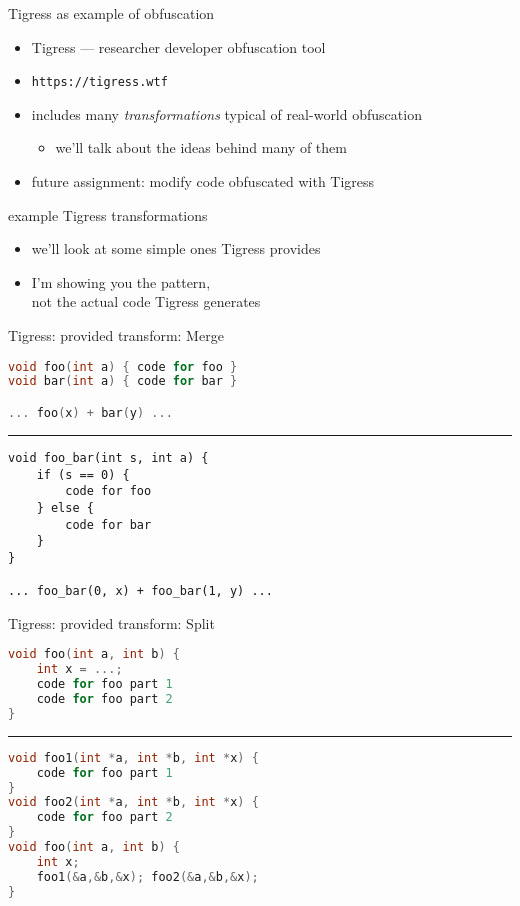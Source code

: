 \begin{frame}{Tigress as example of obfuscation}
    \begin{itemize}
    \item Tigress --- researcher developer obfuscation tool
    \item \texttt{https://tigress.wtf}
    \item includes many \textit{transformations} typical of real-world obfuscation
        \begin{itemize}
        \item we'll talk about the ideas behind many of them
        \end{itemize}
    \vspace{.5cm}
    \item future assignment: modify code obfuscated with Tigress
    \end{itemize}
\end{frame}
\begin{frame}{example Tigress transformations}
    \begin{itemize}
    \item we'll look at some simple ones Tigress provides
    \item I'm showing you the pattern, \\ not the actual code Tigress generates
    \end{itemize}
\end{frame}

\begin{frame}[fragile,label=TigressMerge]{Tigress: provided transform: Merge}
\begin{lstlisting}[language=C++,style=smaller]
void foo(int a) { code for foo }
void bar(int a) { code for bar }

... foo(x) + bar(y) ...
\end{lstlisting}
\hrule
\begin{lstlisting}
void foo_bar(int s, int a) {
    if (s == 0) {
        code for foo
    } else {
        code for bar
    }
}

... foo_bar(0, x) + foo_bar(1, y) ...
\end{lstlisting}
\end{frame}

\begin{frame}[fragile,label=TigressSplit]{Tigress: provided transform: Split}
\begin{lstlisting}[language=C++,style=smaller]
void foo(int a, int b) {
    int x = ...;
    code for foo part 1
    code for foo part 2
}
\end{lstlisting}
\hrule
\begin{lstlisting}[language=C++,style=smaller]
void foo1(int *a, int *b, int *x) {
    code for foo part 1
}
void foo2(int *a, int *b, int *x) {
    code for foo part 2
}
void foo(int a, int b) {
    int x;
    foo1(&a,&b,&x); foo2(&a,&b,&x);
}
\end{lstlisting}
\end{frame}

